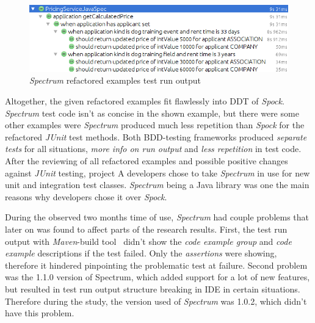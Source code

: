     \begin{figure}[H]
      \begin{center}
        \begin{topbot}[style=mdstyle]
        \includegraphics[width=\textwidth]{images/spectrum-pricing-results.png}
        \end{topbot}
        \caption{\textit{Spectrum} refactored examples test run output}
        \label{fig:spectrum-allu-refactor-output}
      \end{center}
    \end{figure}

    Altogether, the given refactored examples fit flawlessly into DDT of \textit{Spock}. \textit{Spectrum} test code isn't as concise in the shown example,
    but there were some other examples were \textit{Spectrum} produced much less repetition than \textit{Spock} for the refactored \textit{JUnit} test methods.
    Both BDD-testing frameworks produced \textit{separate tests} for all situations, \textit{more info on run output} and \textit{less repetition} in test code.
    After the reviewing of all refactored examples and possible positive changes against \textit{JUnit} testing, project A developers chose to take
    \textit{Spectrum} in use for new unit and integration test classes. \textit{Spectrum} being a Java library was one the main reasons
    why developers chose it over \textit{Spock}.

    During the observed two months time of use, \textit{Spectrum} had couple problems that later on was found to affect parts of the research
    results. First, the test run output with \textit{Maven}-build tool~\cite{maven} didn't show the \textit{code example group} and \textit{code example}
    descriptions if the test failed. Only the \textit{assertions} were showing, therefore it hindered pinpointing the problematic test at failure.
    Second problem was the 1.1.0 version of Spectrum, which added support for a lot of new features, but resulted in test
    run output structure breaking in IDE in certain situations. Therefore during the study, the version used of \textit{Spectrum} was 1.0.2,
    which didn't have this problem.

